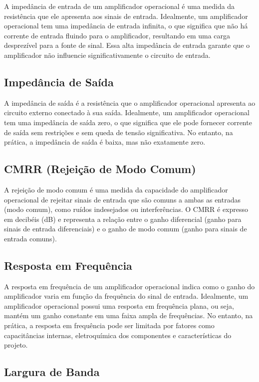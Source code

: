 \documentclass[12pt,twoside, a4paper, twocolumn]{article}
\begin{document}
A impedância de entrada de um amplificador operacional é uma medida da resistência que ele apresenta aos sinais de entrada. Idealmente, um amplificador operacional tem uma impedância de entrada infinita, o que significa que não há corrente de entrada fluindo para o amplificador, resultando em uma carga desprezível para a fonte de sinal. Essa alta impedância de entrada garante que o amplificador não influencie significativamente o circuito de entrada.


\subsection{Impedância de Saída}


A impedância de saída é a resistência que o amplificador operacional apresenta ao circuito externo conectado à sua saída. Idealmente, um amplificador operacional tem uma impedância de saída zero, o que significa que ele pode fornecer corrente de saída sem restrições e sem queda de tensão significativa. No entanto, na prática, a impedância de saída é baixa, mas não exatamente zero.


\subsection{CMRR (Rejeição de Modo Comum)}


A rejeição de modo comum é uma medida da capacidade do amplificador operacional de rejeitar sinais de entrada que são comuns a ambas as entradas (modo comum), como ruídos indesejados ou interferências. O CMRR é expresso em decibéis (dB) e representa a relação entre o ganho diferencial (ganho para sinais de entrada diferenciais) e o ganho de modo comum (ganho para sinais de entrada comuns).


\subsection{Resposta em Frequência}


A resposta em frequência de um amplificador operacional indica como o ganho do amplificador varia em função da frequência do sinal de entrada. Idealmente, um amplificador operacional possui uma resposta em frequência plana, ou seja, mantém um ganho constante em uma faixa ampla de frequências. No entanto, na prática, a resposta em frequência pode ser limitada por fatores como capacitâncias internas, eletroquímica dos componentes e características do projeto.


\subsection{Largura de Banda}
\end{document}
